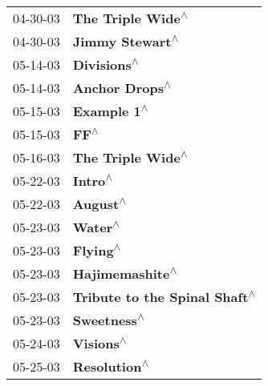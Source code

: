 \begin{supertabular}{p{0.25\columnwidth}p{0.75\columnwidth}}
 04-30-03 &                                                          \textbf{The Triple Wide\textsuperscript{$\wedge$}} \\
 04-30-03 &                                                            \textbf{Jimmy Stewart\textsuperscript{$\wedge$}} \\
 05-14-03 &                                                                \textbf{Divisions\textsuperscript{$\wedge$}} \\
 05-14-03 &                                                             \textbf{Anchor Drops\textsuperscript{$\wedge$}} \\
 05-15-03 &                                                                \textbf{Example 1\textsuperscript{$\wedge$}} \\
 05-15-03 &                                                                       \textbf{FF\textsuperscript{$\wedge$}} \\
 05-16-03 &                                                          \textbf{The Triple Wide\textsuperscript{$\wedge$}} \\
 05-22-03 &                                                                    \textbf{Intro\textsuperscript{$\wedge$}} \\
 05-22-03 &                                                                   \textbf{August\textsuperscript{$\wedge$}} \\
 05-23-03 &                                                                    \textbf{Water\textsuperscript{$\wedge$}} \\
 05-23-03 &                                                                   \textbf{Flying\textsuperscript{$\wedge$}} \\
 05-23-03 &                                                            \textbf{Hajimemashite\textsuperscript{$\wedge$}} \\
 05-23-03 &                                              \textbf{Tribute to the Spinal Shaft\textsuperscript{$\wedge$}} \\
 05-23-03 &                                                                \textbf{Sweetness\textsuperscript{$\wedge$}} \\
 05-24-03 &                                                                  \textbf{Visions\textsuperscript{$\wedge$}} \\
 05-25-03 &                                                               \textbf{Resolution\textsuperscript{$\wedge$}} \\

\end{supertabular}
